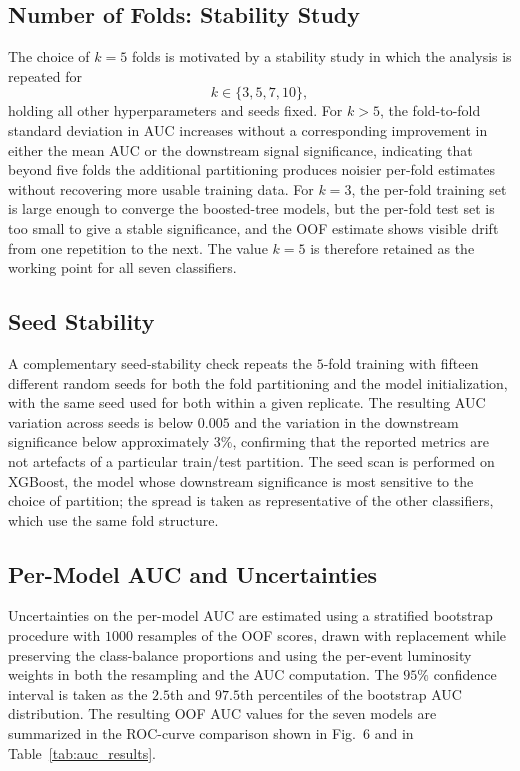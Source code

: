 \documentclass[conference]{IEEEtran}
\begin{document}
{\subsection{Number of Folds: Stability Study}
 
The choice of $k=5$ folds is motivated by a stability study in
which the analysis is repeated for
\[
k\in\{3,5,7,10\},
\]
holding all other hyperparameters and seeds fixed. For $k>5$,
the fold-to-fold standard deviation in AUC increases without a
corresponding improvement in either the mean AUC or the
downstream signal significance, indicating that beyond five
folds the additional partitioning produces noisier per-fold
estimates without recovering more usable training data. For
$k=3$, the per-fold training set is large enough to converge
the boosted-tree models, but the per-fold test set is too
small to give a stable significance, and the OOF estimate shows
visible drift from one repetition to the next. The value
$k=5$ is therefore retained as the working point for all seven
classifiers.
 
\subsection{Seed Stability}
 
A complementary seed-stability check repeats the $5$-fold
training with fifteen different random seeds for both the fold
partitioning and the model initialization, with the same seed
used for both within a given replicate. The resulting AUC
variation across seeds is below $0.005$ and the variation in
the downstream significance below approximately $3\%$,
confirming that the reported metrics are not artefacts of a
particular train/test partition. The seed scan is performed
on XGBoost, the model whose downstream significance is most
sensitive to the choice of partition; the spread is taken as
representative of the other classifiers, which use the same
fold structure.
 
\subsection{Per-Model AUC and Uncertainties}
 
Uncertainties on the per-model AUC are estimated using a
stratified bootstrap procedure with $1000$ resamples of the
OOF scores, drawn with replacement while preserving the
class-balance proportions and using the per-event luminosity
weights in both the resampling and the AUC computation. The
$95\%$ confidence interval is taken as the $2.5$th and
$97.5$th percentiles of the bootstrap AUC distribution. The
resulting OOF AUC values for the seven models are summarized
in the ROC-curve comparison shown in Fig.~6 and in
Table~\ref{tab:auc_results}.

}
\end{document}

